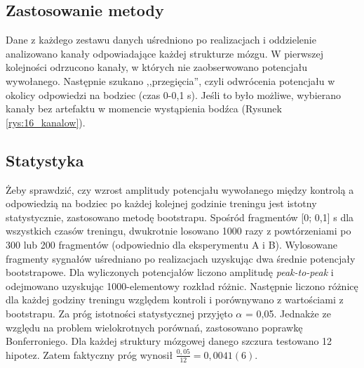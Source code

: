 \documentclass{pracamgr_2}
\begin{document}
	\subsection{Zastosowanie metody}\label{sec:zast_pot}
	Dane z każdego zestawu danych uśredniono po realizacjach i oddzielenie analizowano kanały odpowiadające każdej strukturze mózgu. W pierwszej kolejności odrzucono kanały, w których nie zaobserwowano potencjału wywołanego. Następnie szukano ,,przegięcia'', czyli odwrócenia potencjału w okolicy odpowiedzi na bodziec (czas 0-0,1 s). Jeśli to było możliwe, wybierano kanały bez artefaktu w momencie wystąpienia bodźca (Rysunek \ref{rys:16_kanalow}).
	\subsection{Statystyka}\label{statystyka}
	Żeby sprawdzić, czy wzrost amplitudy potencjału wywołanego między kontrolą a odpowiedzią na bodziec po każdej kolejnej godzinie treningu jest istotny statystycznie, zastosowano metodę bootstrapu. Spośród fragmentów [0; 0,1] s dla wszystkich czasów treningu, dwukrotnie losowano 1000 razy z powtórzeniami po 300 lub 200 fragmentów (odpowiednio dla eksperymentu A i B). Wylosowane fragmenty sygnałów uśredniano po realizacjach uzyskując dwa średnie potencjały bootstrapowe. Dla wyliczonych potencjałów liczono amplitudę \emph{peak-to-peak} i odejmowano uzyskując 1000-elementowy rozkład różnic. Następnie liczono różnicę dla każdej godziny treningu względem kontroli i porównywano z wartościami z bootstrapu. Za próg istotności statystycznej przyjęto $\alpha$ = 0,05. Jednakże ze względu na problem wielokrotnych porównań, zastosowano poprawkę Bonferroniego. Dla każdej struktury mózgowej danego szczura testowano 12 hipotez. Zatem faktyczny próg wynosił $\frac{0,05}{12}=0,0041(6)$.
\end{document}
